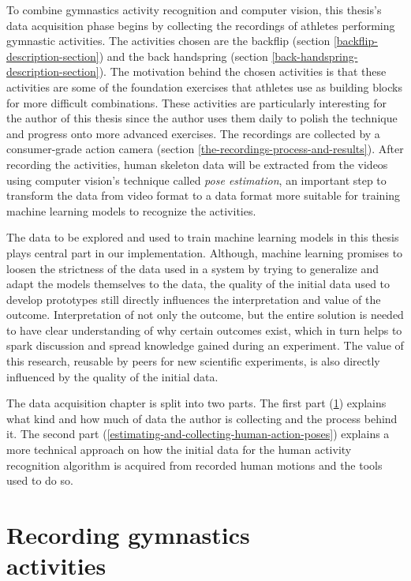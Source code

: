 To combine gymnastics activity recognition and computer vision, this thesis's data acquisition phase begins by collecting the recordings of athletes performing gymnastic activities. The activities chosen are the backflip (section \ref{backflip-description-section}) and the back handspring (section \ref{back-handspring-description-section}). The motivation behind the chosen activities is that these activities are some of the foundation exercises that athletes use as building blocks for more difficult combinations. These activities are particularly interesting for the author of this thesis since the author uses them daily to polish the technique and progress onto more advanced exercises. The recordings are collected by a consumer-grade action camera (section \ref{the-recordings-process-and-results}). After recording the activities, human skeleton data will be extracted from the videos using computer vision's technique called \textit{pose estimation}, an important step to transform the data from video format to a data format more suitable for training machine learning models to recognize the activities.

The data to be explored and used to train machine learning models in this thesis plays central part in our implementation. Although, machine learning promises to loosen the strictness of the data used in a system by trying to generalize and adapt the models themselves to the data, the quality of the initial data used to develop prototypes still directly influences the interpretation and value of the outcome. Interpretation of not only the outcome, but the entire solution is needed to have clear understanding of why certain outcomes exist, which in turn helps to spark discussion and spread knowledge gained during an experiment. The value of this research, reusable by peers for new scientific experiments, is also directly influenced by the quality of the initial data. 

The data acquisition chapter is split into two parts. The first part (\ref{recording-human-actions}) explains what kind and how much of data the author is collecting and the process behind it. The second part (\ref{estimating-and-collecting-human-action-poses}) explains a more technical approach on how the initial data for the human activity recognition algorithm is acquired from recorded human motions and the tools used to do so.

\section{Recording gymnastics\\ activities}
\label{recording-human-actions}

